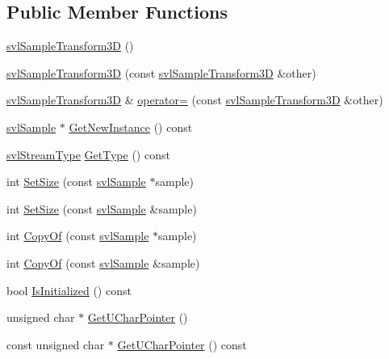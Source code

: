 \subsection*{Public Member Functions}
\begin{DoxyCompactItemize}
\item 
\hyperlink{classsvl_sample_transform3_d_aac6f38dfe210530007211d3c7cf4ee79}{svl\+Sample\+Transform3\+D} ()
\item 
\hyperlink{classsvl_sample_transform3_d_a6cced4e1ac941a83bcb5b6af1089cf15}{svl\+Sample\+Transform3\+D} (const \hyperlink{classsvl_sample_transform3_d}{svl\+Sample\+Transform3\+D} \&other)
\item 
\hyperlink{classsvl_sample_transform3_d}{svl\+Sample\+Transform3\+D} \& \hyperlink{classsvl_sample_transform3_d_a8fabdf6b11acb3009a039f7f329706bb}{operator=} (const \hyperlink{classsvl_sample_transform3_d}{svl\+Sample\+Transform3\+D} \&other)
\item 
\hyperlink{classsvl_sample}{svl\+Sample} $\ast$ \hyperlink{classsvl_sample_transform3_d_ac045767e17a10f4a42b1fc0e568bf22d}{Get\+New\+Instance} () const 
\item 
\hyperlink{svl_definitions_8h_aa00696d338a58db361335a01fd11e122}{svl\+Stream\+Type} \hyperlink{classsvl_sample_transform3_d_ab69212c88dd551726eec9f0883ebcb1e}{Get\+Type} () const 
\item 
int \hyperlink{classsvl_sample_transform3_d_a6b32c4145e10e6193d4d83828cb45fad}{Set\+Size} (const \hyperlink{classsvl_sample}{svl\+Sample} $\ast$sample)
\item 
int \hyperlink{classsvl_sample_transform3_d_abc127a5d4223724687cbf4982bd5f08c}{Set\+Size} (const \hyperlink{classsvl_sample}{svl\+Sample} \&sample)
\item 
int \hyperlink{classsvl_sample_transform3_d_a4dec1a9e2fdd122229711f94e9dba92e}{Copy\+Of} (const \hyperlink{classsvl_sample}{svl\+Sample} $\ast$sample)
\item 
int \hyperlink{classsvl_sample_transform3_d_a9b01c6e57f2c0138598df42db508da89}{Copy\+Of} (const \hyperlink{classsvl_sample}{svl\+Sample} \&sample)
\item 
bool \hyperlink{classsvl_sample_transform3_d_a282e1f27d31932a7a8b58dfa8db3ecec}{Is\+Initialized} () const 
\item 
unsigned char $\ast$ \hyperlink{classsvl_sample_transform3_d_aea81ed64be254fe18907908f2e936a2a}{Get\+U\+Char\+Pointer} ()
\item 
const unsigned char $\ast$ \hyperlink{classsvl_sample_transform3_d_a1545342a3baa4215817893732b1fee2b}{Get\+U\+Char\+Pointer} () const 

\end{DoxyCompactItemize}
